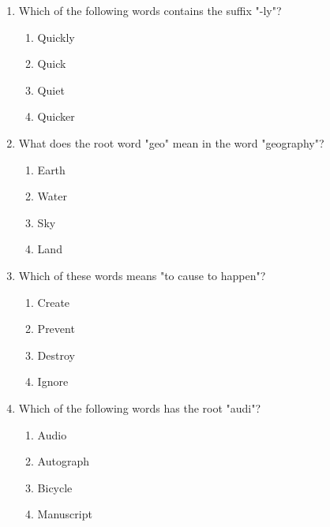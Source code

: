 \documentclass[12pt]{article}
\begin{document}
\begin{enumerate}
    \vspace{0.5cm}

    \item Which of the following words contains the suffix "-ly"?

    \begin{enumerate}[label=\Alph*.]
        \item Quickly
        \item Quick
        \item Quiet
        \item Quicker
    \end{enumerate}
    
    \vspace{0.5cm}

    \item What does the root word "geo" mean in the word "geography"?

    \begin{enumerate}[label=\Alph*.]
        \item Earth
        \item Water
        \item Sky
        \item Land
    \end{enumerate}
    
    \vspace{0.5cm}

    \item Which of these words means "to cause to happen"?

    \begin{enumerate}[label=\Alph*.]
        \item Create
        \item Prevent
        \item Destroy
        \item Ignore
    \end{enumerate}
    
    \vspace{0.5cm}

    \item Which of the following words has the root "audi"?

    \begin{enumerate}[label=\Alph*.]
        \item Audio
        \item Autograph
        \item Bicycle
        \item Manuscript
    \end{enumerate}
    

\end{enumerate}
\end{document}
